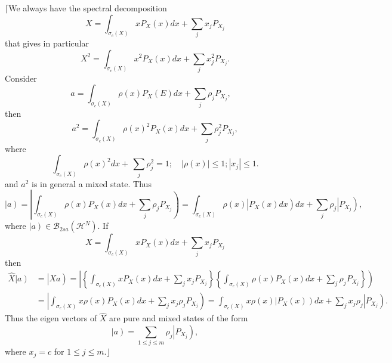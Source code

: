 \documentclass[aps,preprint]{revtex4}%
\begin{document}
$\lceil$We always have the spectral decomposition
\begin{equation}
X=\int_{\sigma_{c}\left(  X\right)  }xP_{X}\left(  x\right)  dx+\sum_{j}%
x_{j}P_{X_{j}}%
\end{equation}
that gives in particular
\begin{equation}
X^{2}=\int_{\sigma_{c}\left(  X\right)  }x^{2}P_{X}\left(  x\right)
dx+\sum_{j}x_{j}^{2}P_{X_{j}}.
\end{equation}
Consider
\begin{equation}
a=\int_{\sigma_{c}\left(  X\right)  }\rho\left(  x\right)  P_{X}\left(
E\right)  dx+\sum_{j}\rho_{j}P_{X_{j}},\quad
\end{equation}
then
\begin{equation}
a^{2}=\int_{\sigma_{c}\left(  X\right)  }\rho\left(  x\right)  ^{2}%
P_{X}\left(  x\right)  dx+\sum_{j}\rho_{j}^{2}P_{X_{j}},
\end{equation}
where%
\begin{equation}
\int_{\sigma_{c}\left(  X\right)  }\rho\left(  x\right)  ^{2}dx+\,\sum_{j}%
\rho_{j}^{2}=1;\quad\left\vert \rho\left(  x\right)  \right\vert
\leq1;\left\vert x_{j}\right\vert \leq1.
\end{equation}
and $a^{2}$ is in general a mixed state. Thus
\begin{equation}
\left\vert \overset{}{a}\right)  =\left\vert \int_{\sigma_{c}\left(  X\right)
}\rho\left(  x\right)  P_{X}\left(  x\right)  dx+\sum_{j}\rho_{j}P_{X_{j}%
}\right)  =\int_{\sigma_{c}\left(  X\right)  }\rho\left(  x\right)  \left\vert
\overset{}{P_{X}\left(  x\right)  dx}\right)  dx+\sum_{j}\rho_{j}\left\vert
\overset{}{P_{X_{j}}}\right)  ,
\end{equation}
where $\left\vert a\right)  \in\mathcal{B}_{2sa}\left(  \mathcal{H}%
^{N}\right)  .$ If
\begin{equation}
X=\int_{\sigma_{c}\left(  X\right)  }xP_{X}\left(  x\right)  dx+\sum_{j}%
x_{j}P_{X_{j}}%
\end{equation}
then
\begin{align}
\widehat{X}\left\vert \overset{}{a}\right)   &  =\left\vert \overset{}%
{Xa}\right)  =\left\vert \left\{  \int_{\sigma_{c}\left(  X\right)  }%
xP_{X}\left(  x\right)  dx+\sum_{j}x_{j}P_{X_{j}}\right\}  \left\{
\int_{\sigma_{c}\left(  X\right)  }\rho\left(  x\right)  P_{X}\left(
x\right)  dx+\sum_{j}\rho_{j}P_{X_{j}}\right\}  \right) \nonumber\\
&  =\left\vert \int_{\sigma_{c}\left(  X\right)  }x\rho\left(  x\right)
P_{X}\left(  x\right)  dx+\sum_{j}x_{j}\rho_{j}P_{X_{j}}\right)  =\int
_{\sigma_{c}\left(  X\right)  }x\rho\left(  x\right)  \left\vert P_{X}\left(
x\right)  \right)  dx+\sum_{j}x_{j}\rho_{j}\left\vert P_{X_{j}}\right)  .
\end{align}
Thus the eigen vectors of $\widehat{X}$ are pure and mixed states of the form
\begin{equation}
\left\vert \overset{}{a}\right)  =\sum_{1\leq j\leq m}\rho_{j}\left\vert
P_{X_{j}}\right)  ,
\end{equation}
where $x_{j}=c$ for $1\leq j\leq m$.$\rfloor$
\end{document}
